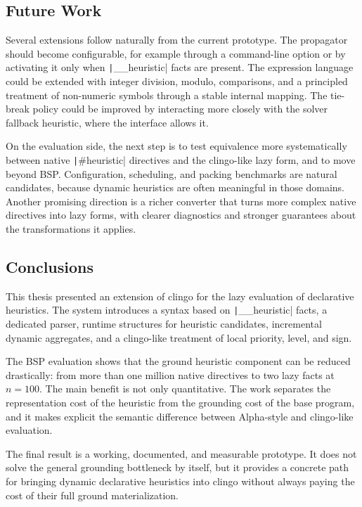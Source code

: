 \subsection{Future Work}

Several extensions follow naturally from the current prototype. The propagator should become configurable, for example through a command-line option or by activating it only when \texttt|__heuristic| facts are present. The expression language could be extended with integer division, modulo, comparisons, and a principled treatment of non-numeric symbols through a stable internal mapping. The tie-break policy could be improved by interacting more closely with the solver fallback heuristic, where the interface allows it.

On the evaluation side, the next step is to test equivalence more systematically between native \texttt|#heuristic| directives and the clingo-like lazy form, and to move beyond BSP. Configuration, scheduling, and packing benchmarks are natural candidates, because dynamic heuristics are often meaningful in those domains. Another promising direction is a richer converter that turns more complex native directives into lazy forms, with clearer diagnostics and stronger guarantees about the transformations it applies.

\subsection{Conclusions}

This thesis presented an extension of clingo for the lazy evaluation of declarative heuristics. The system introduces a syntax based on \texttt|__heuristic| facts, a dedicated parser, runtime structures for heuristic candidates, incremental dynamic aggregates, and a clingo-like treatment of local priority, level, and sign.

The BSP evaluation shows that the ground heuristic component can be reduced drastically: from more than one million native directives to two lazy facts at $n=100$. The main benefit is not only quantitative. The work separates the representation cost of the heuristic from the grounding cost of the base program, and it makes explicit the semantic difference between Alpha-style and clingo-like evaluation.

The final result is a working, documented, and measurable prototype. It does not solve the general grounding bottleneck by itself, but it provides a concrete path for bringing dynamic declarative heuristics into clingo without always paying the cost of their full ground materialization.
